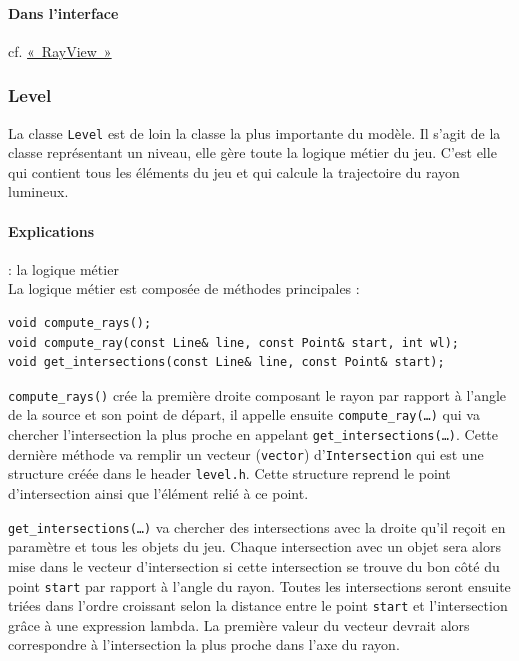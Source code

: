 \documentclass[]{report}
\begin{document}
\paragraph{Dans l'interface} cf. \hyperref[RayView]{«~RayView~»}


\subsubsection{\label{Level}Level}

La classe \texttt{Level} est de loin la classe la plus importante du modèle.
Il s'agit de la classe représentant un niveau, elle gère toute la logique métier
du jeu. C'est elle qui contient tous les éléments du jeu et qui calcule
la trajectoire du rayon lumineux.

\paragraph{Explications} : la logique métier \\

La logique métier est composée de méthodes principales : 

\begin{lstlisting}
void compute_rays();
void compute_ray(const Line& line, const Point& start, int wl);
void get_intersections(const Line& line, const Point& start);
\end{lstlisting}

\texttt{compute\_rays()} crée la première droite composant le rayon par rapport à l'angle de la 
source et son point de départ, il appelle ensuite \texttt{compute\_ray(\dots)} qui va chercher
l'intersection la plus proche en appelant \texttt{get\_intersections(\dots)}. Cette dernière méthode
va remplir un vecteur (\texttt{vector}) d'\texttt{Intersection} qui est une structure créée dans 
le header \texttt{level.h}. Cette structure reprend le point d'intersection ainsi que l'élément relié à ce point.

\texttt{get\_intersections(\dots)} va chercher des intersections avec la droite qu'il reçoit en paramètre
et tous les objets du jeu. Chaque intersection avec un objet sera alors mise dans le vecteur d'intersection
si cette intersection se trouve du bon côté du point \texttt{start} par rapport à l'angle du rayon.
Toutes les intersections seront ensuite triées dans l'ordre croissant selon la distance entre le point \texttt{start} et
l'intersection grâce à une expression lambda.
La première valeur du vecteur devrait alors correspondre à l'intersection la plus proche dans l'axe du rayon.
\end{document}
